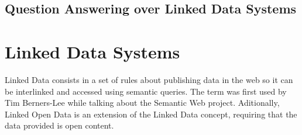 \subsection{Question Answering over Linked Data Systems}
\label{subsec:qa_linked}



\section{Linked Data Systems}
\label{sec:linkd_sys}

Linked Data consists in a set of rules about publishing data in the web so it can be interlinked and accessed using semantic queries. The term was first used by Tim Berners-Lee while talking about the Semantic Web project. Aditionally, Linked Open Data is an extension of the Linked Data concept, requiring that the data provided is open content.

